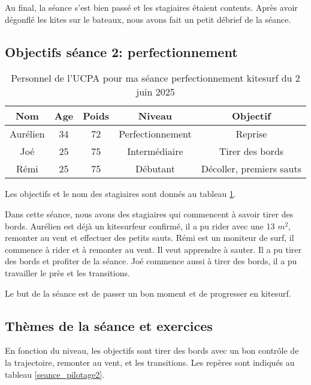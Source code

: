 \documentclass[11pt,a4paper]{report}
\begin{document}
Au final, la séance s'est bien passé et les stagiaires étaient contents.
Après avoir dégonflé les kites sur le bateaux, nous avons fait un
petit débrief de la séance.
\subsection{Objectifs séance 2: perfectionnement}

\begin{table}[h]
\centering
\begin{tabular}{|c|c|c|c|c|}
        \hline
        \textbf{Nom} & \textbf{Age} & \textbf{Poids}& \textbf{Niveau}     &  \textbf{Objectif} \\ 
        \hline
        Aurélien      &  34          &  72           &   Perfectionnement  & Reprise \\
        Joé           &  25          &  75           &   Intermédiaire     & Tirer des bords \\
        Rémi          &  25          & 75            &  Débutant           &  Décoller, premiers sauts  \\
        \hline
\end{tabular}
\caption{Personnel de l'UCPA pour ma séance perfectionnement kitesurf du 2 juin 2025\label{stagiaires_perf}}
\end{table}
Les objectifs et le nom des stagiaires sont donnés au tableau \ref{stagiaires_perf}.

Dans cette séance, nous avons des stagiaires qui commencent à savoir tirer des bords.
Aurélien est déj\`a un kitesurfeur confirmé, il a pu rider avec une 13 $m^2$, 
remonter au vent et effectuer des petits sauts.
Rémi est un moniteur de surf, il commence à rider et à remonter au vent. 
Il veut apprendre à sauter.
Il a pu tirer des bords et profiter de la séance.
Joé commence aussi à tirer des bords, il a pu travailler le près et les transitions.

Le but de la séance est de passer un bon moment et de progresser en kitesurf.
\subsection{Thèmes de la séance et exercices}
En fonction du niveau, les objectifs sont tirer des bords avec un bon contrôle de la 
trajectoire, remonter au vent, et les transitions. Les repères sont indiqués
au tableau \ref{seance_pilotage2}.
\end{document}

